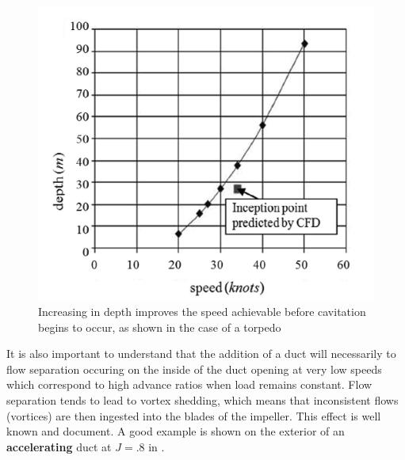 \documentclass{article}\usepackage[]{graphicx}\usepackage[]{color}
\begin{document}
\begin{figure}
\includegraphics[width=\textwidth]{InceptionDepth.png}
\caption{Increasing in depth improves the speed achievable before cavitation begins to occur, as shown in the case of a torpedo \parencite{suryanarayana2010cavitation}}
\label{fig:InceptionDepth.png}
\end{figure}

It is also important to understand that the addition of a duct will necessarily to flow separation occuring on the inside of the duct opening at very low speeds which correspond to high advance ratios when load remains constant.  Flow separation tends to lead to vortex shedding, which means that inconsistent flows (vortices) are then ingested into the blades of the impeller.  This effect is well known and document.  A good example is shown on the exterior of an \textbf{accelerating} duct at $J = .8$ in \cite{willemsen2013}.
\end{document}
